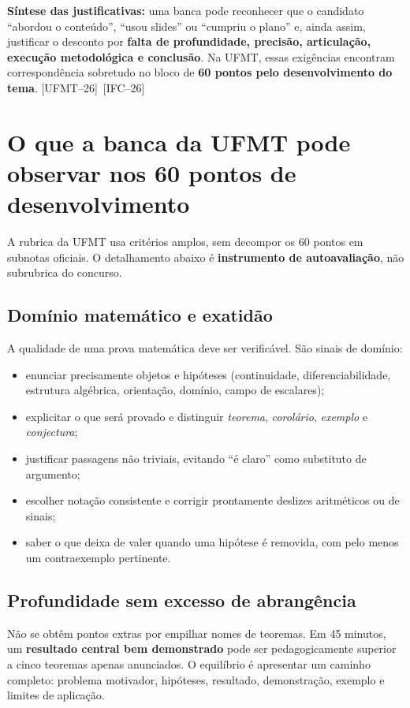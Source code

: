 \documentclass[11pt,a4paper]{article}
\newcommand{\fufmt}{\textsf{[UFMT--26]}}
\newcommand{\fifc}{\textsf{[IFC--26]}}
\begin{document}
\begin{ideia}
\textbf{Síntese das justificativas:} uma banca pode reconhecer que o candidato ``abordou o conteúdo'', ``usou slides'' ou ``cumpriu o plano'' e, ainda assim, justificar o desconto por \textbf{falta de profundidade, precisão, articulação, execução metodológica e conclusão}. Na UFMT, essas exigências encontram correspondência sobretudo no bloco de \textbf{60 pontos pelo desenvolvimento do tema}. \fufmt\ \fifc
\end{ideia}

\section{O que a banca da UFMT pode observar nos 60 pontos de desenvolvimento}
A rubrica da UFMT usa critérios amplos, sem decompor os 60 pontos em subnotas oficiais. O detalhamento abaixo é \textbf{instrumento de autoavaliação}, não subrubrica do concurso.

\subsection{Domínio matemático e exatidão}
A qualidade de uma prova matemática deve ser verificável. São sinais de domínio:
\begin{itemize}
\item enunciar precisamente objetos e hipóteses (continuidade, diferenciabilidade, estrutura algébrica, orientação, domínio, campo de escalares);
\item explicitar o que será provado e distinguir \emph{teorema}, \emph{corolário}, \emph{exemplo} e \emph{conjectura};
\item justificar passagens não triviais, evitando ``é claro'' como substituto de argumento;
\item escolher notação consistente e corrigir prontamente deslizes aritméticos ou de sinais;
\item saber o que deixa de valer quando uma hipótese é removida, com pelo menos um contraexemplo pertinente.
\end{itemize}

\subsection{Profundidade sem excesso de abrangência}
Não se obtêm pontos extras por empilhar nomes de teoremas. Em 45 minutos, um \textbf{resultado central bem demonstrado} pode ser pedagogicamente superior a cinco teoremas apenas anunciados. O equilíbrio é apresentar um caminho completo: problema motivador, hipóteses, resultado, demonstração, exemplo e limites de aplicação.
\end{document}
